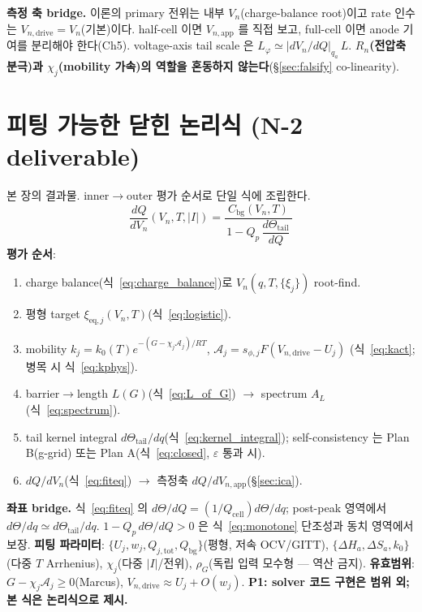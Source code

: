 \documentclass[11pt,a4paper]{article}
\newcommand{\eq}{\mathrm{eq}}
\newcommand{\app}{\mathrm{app}}
\newcommand{\drive}{\mathrm{drive}}
\newcommand{\tot}{\mathrm{tot}}
\newcommand{\bg}{\mathrm{bg}}
\newcommand{\cell}{\mathrm{cell}}
\begin{document}
\textbf{측정 축 bridge.} 이론의 primary 전위는 내부 $V_n$(charge-balance root)이고 rate 인수는
$V_{n,\drive}=V_n$(기본)이다. half-cell 이면 $V_{n,\app}$ 를 직접 보고, full-cell 이면 anode 기여를 분리해야
한다(Ch5). voltage-axis tail scale 은 $L_\varphi\simeq|dV_n/dQ|_{q_a}\,L$. \textbf{$R_n$(전압축 분극)과
$\chi_j$(mobility 가속)의 역할을 혼동하지 않는다}(\S\ref{sec:falsify} co-linearity).

\section{피팅 가능한 닫힌 논리식 (N-2 deliverable)}\label{sec:fiteq}
본 장의 결과물. inner$\to$outer 평가 순서로 단일 식에 조립한다.
\begin{equation}
\boxed{\;\frac{dQ}{dV_n}(V_n,T,|I|)=\frac{C_\bg(V_n,T)}{\,1-Q_p\,\dfrac{d\Theta_\mathrm{tail}}{dQ}\,}\;}
\label{eq:fiteq}
\end{equation}
\textbf{평가 순서}:
\begin{enumerate}[label=\textbf{S\arabic*.},leftmargin=2.2em]
\item charge balance(식~\eqref{eq:charge_balance})로 $V_n(q,T,\{\xi_j\})$ root-find.
\item 평형 target $\xi_{\eq,j}(V_n,T)$(식~\eqref{eq:logistic}).
\item mobility $k_j=k_0(T)e^{-(G-\chi_j\mathcal A_j)/RT}$, $\mathcal A_j=s_{\phi,j}F(V_{n,\drive}-U_j)$
  (식~\eqref{eq:kact}; 병목 시 식~\eqref{eq:kphys}).
\item barrier$\to$length $L(G)$(식~\eqref{eq:L_of_G}) $\to$ spectrum $A_L$(식~\eqref{eq:spectrum}).
\item tail kernel integral $d\Theta_\mathrm{tail}/dq$(식~\eqref{eq:kernel_integral}); self-consistency 는
  Plan B(g-grid) 또는 Plan A(식~\eqref{eq:closed}, $\varepsilon$ 통과 시).
\item $dQ/dV_n$(식~\eqref{eq:fiteq}) $\to$ 측정축 $dQ/dV_{n,\app}$(\S\ref{sec:ica}).
\end{enumerate}
\textbf{좌표 bridge.} 식~\eqref{eq:fiteq} 의 $d\Theta/dQ=(1/Q_\cell)d\Theta/dq$; post-peak 영역에서
$d\Theta/dq\simeq d\Theta_\mathrm{tail}/dq$. $1-Q_p\,d\Theta/dQ>0$ 은 식~\eqref{eq:monotone} 단조성과
동치 영역에서 보장.
\textbf{피팅 파라미터}: $\{U_j,w_j,Q_{j,\tot},Q_\bg\}$(평형, 저속 OCV/GITT), $\{\Delta H_a,\Delta S_a,k_0\}$
(다중 $T$ Arrhenius), $\chi_j$(다중 $|I|$/전위), $\rho_G$(독립 입력 모수형 — 역산 금지).
\textbf{유효범위}: $G-\chi_j\mathcal A_j\ge0$(Marcus), $V_{n,\drive}\approx U_j+O(w_j)$.
\textbf{P1: solver 코드 구현은 범위 외; 본 식은 논리식으로 제시.}
\end{document}
